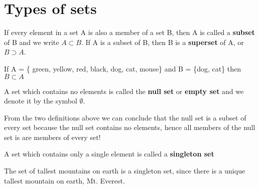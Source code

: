 \section{Types of sets}
\begin{definition}
If every element in a set A is also a member of a set B, then A is called a \textbf{subset} of B and we write $A \subset B$. If A is a subset of B, then B is a \textbf{superset} of A, or $B \supset A$.
\end{definition}

\begin{example}
If A = \{ green, yellow, red, black, dog, cat, mouse\} and B = \{dog, cat\} then  $B \subset A$
\end{example}

\begin{definition}
A set which contains no elements is called the \textbf{null set} or \textbf{empty set} and we denote it by the symbol $\emptyset$.
\end{definition}

\begin{remark}
From the two definitions above we can conclude that the null set is a subset of every set because the null set contains no elements, hence all members of the null set is are members of every set!
\end{remark}

\begin{definition}
A set which contains only a single element is called a \textbf{singleton set}
\end{definition}

\begin{example}
The set of tallest mountains on earth is a singleton set, since there is a unique tallest mountain on earth, Mt. Everest.
\end{example}


